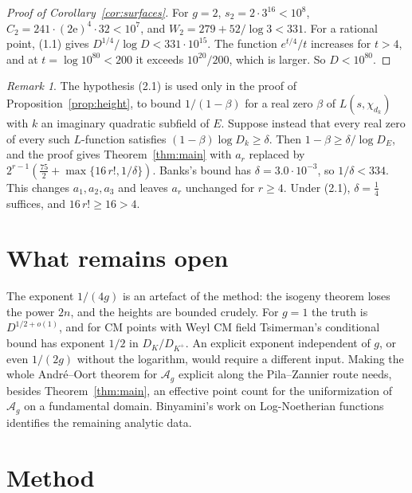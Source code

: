 \documentclass[11pt,a4paper]{article}
\theoremstyle{plain}
\theoremstyle{remark}
\newtheorem{remark}[theorem]{Remark}
\newcommand{\Ag}{\mathcal A_g}
\begin{document}
\begin{proof}[Proof of Corollary~\ref{cor:surfaces}]
For $g=2$, $s_2=2\cdot3^{16}<10^8$, $C_2=241\cdot(2\mathrm e)^4\cdot32<10^7$, and $W_2=279+52/\log3<331$. For a
rational point, (1.1) gives $D^{1/4}/\log D<331\cdot10^{15}$. The function $e^{t/4}/t$ increases for $t>4$, and at
$t=\log10^{80}<200$ it exceeds $10^{20}/200$, which is larger. So $D<10^{80}$.
\end{proof}

\begin{remark}\label{rem:other-inputs}
The hypothesis (2.1) is used only in the proof of Proposition~\ref{prop:height}, to bound $1/(1-\beta)$ for a real zero
$\beta$ of $L(s,\chi_{d_k})$ with $k$ an imaginary quadratic subfield of $E$. Suppose instead that every real zero of
every such $L$-function satisfies $(1-\beta)\log D_k\geq\delta$. Then $1-\beta\geq\delta/\log D_E$, and the proof gives
Theorem~\ref{thm:main} with $a_r$ replaced by $2^{r-1}(\frac{75}2+\max\{16\,r!,1/\delta\})$. Banks's bound
\cite[abstract]{Banks} has $\delta=3.0\cdot10^{-3}$, so $1/\delta<334$. This changes $a_1,a_2,a_3$ and
leaves $a_r$ unchanged for $r\geq4$. Under (2.1), $\delta=\frac14$ suffices, and $16\,r!\geq16>4$.
\end{remark}

\section{What remains open}

The exponent $1/(4g)$ is an artefact of the method: the isogeny theorem loses the power $2n$, and the heights are
bounded crudely. For $g=1$ the truth is $D^{1/2+o(1)}$, and for CM points with Weyl CM field Tsimerman's conditional
bound \cite{Ts12} has exponent $1/2$ in $D_K/D_{K^+}$. An explicit exponent independent of $g$, or even $1/(2g)$
without the logarithm, would require a different input. Making the whole Andr\'e--Oort theorem for $\Ag$ explicit
along the Pila--Zannier route needs, besides Theorem~\ref{thm:main}, an effective point count for the uniformization
of $\Ag$ on a fundamental domain. Binyamini's work on Log-Noetherian functions \cite[\S10]{BinLN} identifies the
remaining analytic data.

\section*{Method}
\end{document}
